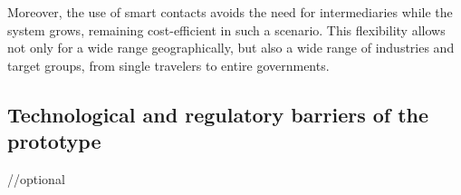 Moreover, the use of smart contacts avoids the need for intermediaries while the system grows, remaining cost-efficient in such a scenario. This flexibility allows not only for a wide range geographically, but also a wide range of industries and target groups, from single travelers to entire governments.

\subsection{Technological and regulatory barriers of the prototype}

//optional